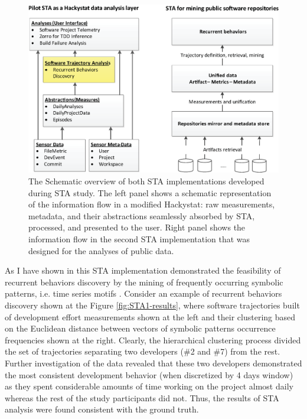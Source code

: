 \begin{figure}[t]
   \centering
   \includegraphics[width=150mm]{figures/STA12-schema-draft.eps}
   \caption{The Schematic overview of both STA implementations developed during STA study. 
   The left panel shows a schematic representation of the information flow in a modified Hackystat: 
   raw measurements, metadata, and their abstractions seamlessly absorbed by STA, processed, and presented to the user.
   Right panel shows the information flow in the second STA implementation that was designed for the analyses of public data.}
   \label{fig:STA12-schema}
\end{figure}

As I have shown in \cite{csdl2-10-09} this STA implementation demonstrated the feasibility of recurrent behaviors discovery 
by the mining of frequently occurring symbolic patterns, i.e. time series motifs \cite{sax}. 
Consider an example of recurrent behaviors discovery shown at the Figure \ref{fig:STA1-results}, where software 
trajectories built of development effort measurements shown at the left and their clustering based on the Euclidean distance 
between vectors of symbolic patterns occurrence frequencies shown at the right. Clearly, the hierarchical clustering 
process divided the set of trajectories separating two developers (\#2 and \#7) from the rest. 
Further investigation of the data revealed that these two developers demonstrated the most consistent development 
behavior (when discretized by 4 days window) as they spent considerable amounts of time working on the project almost daily
whereas the rest of the study participants did not. Thus, the results of STA analysis were found consistent with the ground truth.

